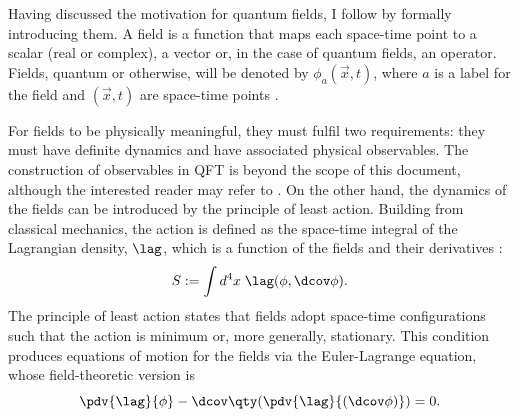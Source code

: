 Having discussed the motivation for quantum fields, I follow by formally introducing them. A field is a function that maps each space-time point to a scalar (real or complex), a vector or, in the case of quantum fields, an operator. Fields, quantum or otherwise, will be denoted by $\phi_a(\Vec{x},t)$, where $a$ is a label for the field and $(\Vec{x},t)$ are space-time points \cite{peskin_introduction_1995}.

For fields to be physically meaningful, they must fulfil two requirements: they must have definite dynamics and have associated physical observables. The construction of observables in QFT is beyond the scope of this document, although the interested reader may refer to \cite{haag_local_1996, araki_mathematical_1999}. On the other hand, the dynamics of the fields can be introduced by the principle of least action. Building from classical mechanics, the action is defined as the space-time integral of the Lagrangian density, $\lag$, which is a function of the fields and their derivatives \cite{peskin_introduction_1995}: 
\begin{equation}
    S := \int d^4{x}\; \lag(\phi, \dcov\phi).
\end{equation}
The principle of least action states that fields adopt space-time configurations such that the action is minimum or, more generally, stationary. This condition produces equations of motion for the fields via the Euler-Lagrange equation, whose field-theoretic version is \cite{lancaster_quantum_2014}
\begin{equation}
    \pdv{\lag}{\phi}-\dcov \qty(\pdv{\lag}{(\dcov \phi)}) = 0.
\end{equation}
    

